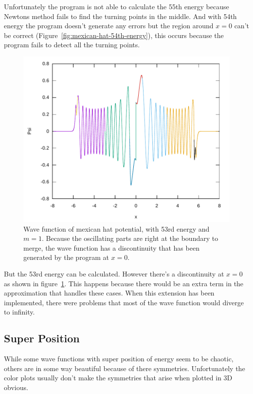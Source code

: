 \documentclass[11pt,DIV=10,final]{scrreprt} %
\begin{document}
\begin{minipage}{\textwidth}
  Unfortunately the program is not able to calculate the 55th energy because Newtons method fails to find the turning points in the middle. And with 54th energy the program doesn't generate any errors
  but the region around $x = 0$ can't be correct (Figure~\ref{fig:mexican-hat-54th-energy}), this occurs because the program fails to detect all the turning points.

\begin{figure}[H]
  \centering
  \includegraphics[width=\textwidth]{plots/mexican-hat-53.pdf}
  \caption{
    Wave function of mexican hat potential, with 53rd energy and $m = 1$. Because the oscillating parts are right at the boundary to merge, the wave function has a discontinuity that has been generated by the program at $x = 0$.
  }\label{fig:mexican-hat-53rd-energy}
\end{figure}
But the 53rd energy can be calculated. However there's a discontinuity at $x = 0$ as shown in figure~\ref{fig:mexican-hat-53rd-energy}. This happens because there would be an extra term in the
approximation that handles these cases. When this extension has been implemented, there were problems that most of the wave function would diverge to infinity.
\end{minipage}

\subsection{Super Position}
While some wave functions with super position of energy seem to be chaotic, others are in some way beautiful because of there symmetries.
Unfortunately the color plots usually don't make the symmetries that arise when plotted in 3D obvious.
\end{document}
